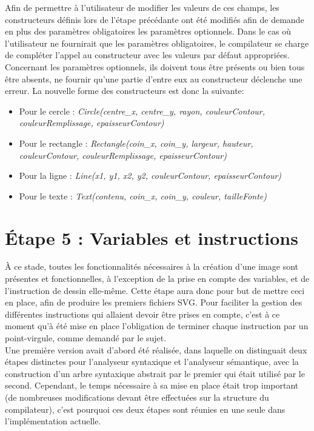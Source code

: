 \documentclass[a4paper, 12pt]{report}
\begin{document}
	Afin de permettre à l'utilisateur de modifier les valeurs de ces champs, les constructeurs définis lors de l'étape précédante ont été modifiés afin de demande en plus des paramètres obligatoires les paramètres optionnels. Dans le cas où l'utilisateur ne fournirait que les paramètres obligatoires, le compilateur se charge de compléter l'appel au constructeur avec les valeurs par défaut appropriées. Concernant les paramètres optionnels, ils doivent tous être présents ou bien tous être absents, ne fournir qu'une partie d'entre eux au constructeur déclenche une erreur. La nouvelle forme des constructeurs est donc la suivante:\\
	
	\begin{itemize}
		\item Pour le cercle : \textit{Circle(centre\_x, centre\_y, rayon, couleurContour, couleurRemplissage, epaisseurContour)}
		\item Pour le rectangle : \textit{Rectangle(coin\_x, coin\_y, largeur, hauteur, couleurContour, couleurRemplissage, epaisseurContour)}
		\item Pour la ligne : \textit{Line(x1, y1, x2, y2, couleurContour, epaisseurContour)}
		\item Pour le texte : \textit{Text(contenu, coin\_x, coin\_y, couleur, tailleFonte)}
	\end{itemize}
	
\chapter{\'Etape 5 : Variables et instructions}

	\`A ce stade, toutes les fonctionnalités nécessaires à la création d'une image sont présentes et fonctionnelles, à l'exception de la prise en compte des variables, et de l'instruction de dessin elle-même. Cette étape aura donc pour but de mettre ceci en place, afin de produire les premiers fichiers SVG. Pour faciliter la gestion des différentes instructions qui allaient devoir être prises en compte, c'est à ce moment qu'à été mise en place l'obligation de terminer chaque instruction par un point-virgule, comme demandé par le sujet.\\
	
	Une première version avait d'abord été réalisée, dans laquelle on distinguait deux étapes distinctes pour l'analyseur syntaxique et l'analyseur sémantique, avec la construction d'un arbre syntaxique abstrait par le premier qui était utilisé par le second. Cependant, le temps nécessaire à sa mise en place était trop important (de nombreuses modifications devant être effectuées sur la structure du compilateur), c'est pourquoi ces deux étapes sont réunies en une seule dans l'implémentation actuelle.
	
\end{document}
